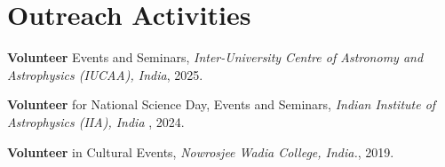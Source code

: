\section{Outreach Activities}
    \begin{onecolentry}
        \textbf{Volunteer} Events and Seminars, 
        \textit{Inter-University Centre of Astronomy and Astrophysics (IUCAA), India}, 
        2025.
    \end{onecolentry}
    \vspace{0.1 cm}
    \begin{onecolentry}
        \textbf{Volunteer} for National Science Day, Events and Seminars,
        \textit{Indian Institute of Astrophysics (IIA), India }\href{https://drive.google.com/file/d/1jqv7ARGRc-WEWB8v_ehg4lC2gxxdSKqm/view?usp=sharing}{\faExternalLink}, 
        2024.
    \end{onecolentry}
    \vspace{0.1 cm}
    \begin{onecolentry}
        \textbf{Volunteer} in Cultural Events, 
        \textit{Nowrosjee Wadia College, India.}, 
        2019.
    \end{onecolentry}
    

    
    

